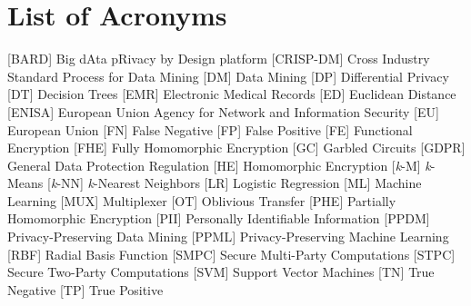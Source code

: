 %

\chapter*{List of Acronyms}
%
\begin{acronym}


 [BARD] {Big dAta pRivacy by Design platform}
 [CRISP-DM] {Cross Industry Standard Process for Data Mining}
 [DM] {Data Mining}
 [DP] {Differential Privacy}
 [DT] {Decision Trees}
 [EMR] {Electronic Medical Records}
 [ED] {Euclidean Distance}
 [ENISA] {European Union Agency for Network and Information Security}
 [EU] {European Union}
 [FN] {False Negative}
 [FP] {False Positive}
 [FE] {Functional Encryption}
 [FHE] {Fully Homomorphic Encryption}
 [GC] {Garbled Circuits}
 [GDPR] {General Data Protection Regulation}
 [HE] {Homomorphic Encryption}
 [\textit{k}-M] {\textit{k}-Means}
 [\textit{k}-NN] {\textit{k}-Nearest Neighbors}
 [LR] {Logistic Regression}
 [ML] {Machine Learning}
 [MUX] {Multiplexer}
 [OT] {Oblivious Transfer}
 [PHE] {Partially Homomorphic Encryption}
 [PII] {Personally Identifiable Information}
 [PPDM] {Privacy-Preserving Data Mining}
 [PPML] {Privacy-Preserving Machine Learning}
 [RBF] {Radial Basis Function}
 [SMPC] {Secure Multi-Party Computations}
 [STPC] {Secure Two-Party Computations}
 [SVM] {Support Vector Machines}
 [TN] {True Negative}
 [TP] {True Positive}

\end{acronym}

\cleardoublepage


